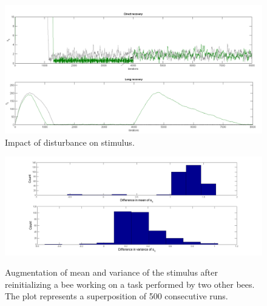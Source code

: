 \begin{figure}[ht!]
\begin{centering}
\includegraphics[scale=0.4]{figures/Figure7}\caption{Impact of disturbance on stimulus.}
\label{fig:figure3}
\par\end{centering}

\centering{}
\end{figure}


\begin{figure}[ht!]
\begin{centering}
\includegraphics[scale=0.35]{figures/Augmentation2_2}
\label{fig:figure4}
\par\end{centering}

\begin{centering}
\caption{Augmentation of mean and variance of the stimulus after reinitializing a bee working on a task performed by two other bees. \\\hspace{\textwidth} The plot represents a superposition of 500 consecutive runs.}

\par\end{centering}

\end{figure}



